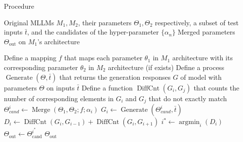 \begin{algorithm}
\caption{\ours Procedure}
\label{alg:composition}
\begin{algorithmic}[1]
\Require Original MLLMs $M_1, M_2$, their parameters $\Theta_1, \Theta_2$ respectively, a subset of test inputs $\bar{t}$, and the candidates of the hyper-parameter $\{\alpha_n\}$
\Ensure Merged parameters $\Theta_{\text{out}}$ on $M_1$'s architecture

 \State Define a mapping $f$ that maps each parameter $\theta_1$ in $M_1$ architecture with its corresponding parameter $\theta_2$ in $M_2$ architecture (if exists) 
\State Define a process $\operatorname*{Generate}(\Theta, \bar{t})$ that returns the generation responses $G$ of model with parameters $\Theta$ on inputs $\bar{t}$
\State Define a function $\operatorname*{DiffCnt}(G_i, G_j)$ that counts the number of corresponding elements in $G_i$ and $G_j$ that do not exactly match
{}
        \State $\Theta_{cand}^{i} \gets \operatorname*{Merge}(\Theta_1, \Theta_2; f; \alpha_i)$ 
        \State $G_i \gets \operatorname*{Generate}(\Theta_{cand}^{i}, \bar{t})$
    \EndFor
\EndFor
{} 
        \State $D_i \gets \operatorname*{DiffCnt}(G_i, G_{i-1}) + \operatorname*{DiffCnt}(G_i, G_{i+1})$
    \EndFor
\EndFor
\State $i^* \gets \operatorname*{argmin}_{i}(D_i)$
\State $\Theta_{\text{out}} \gets \Theta_{\text{cand}}^{i^*}$
\State \Return $\Theta_{\text{out}}$
\end{algorithmic}
\end{algorithm}

